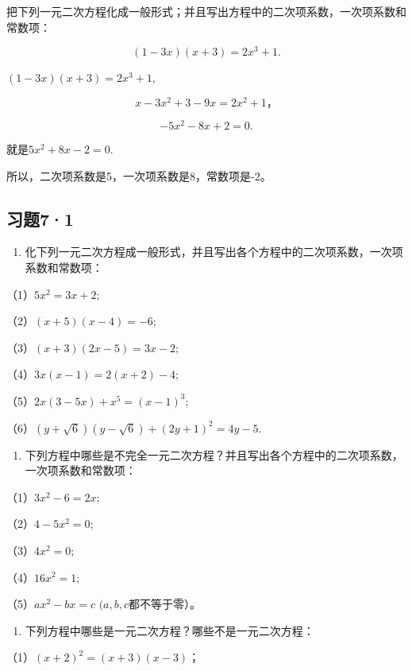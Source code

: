 把下列一元二次方程化成一般形式；并且写出方程中的二次项系数，一次项系数和常数项：

\[
(1 - 3 x) (x + 3) = 2 x ^ {3} + 1.
\]

 \((1 - 3x)(x + 3) = 2x^{3} + 1,\)

\[
x - 3 x ^ {2} + 3 - 9 x = 2 x ^ {2} + 1\text{，}
\]

\[
- 5 x ^ {2} - 8 x + 2 = 0.
\]

就是\(5x^{2} + 8x - 2 = 0.\)

所以，二次项系数是5，一次项系数是8，常数项是-2。

\subsection{习题7·1}

\begin{enumerate}
\item
  化下列一元二次方程成一般形式，并且写出各个方程中的二次项系数，一次项系数和常数项：
\end{enumerate}

（1）\(5x^{2} = 3x + 2;\)

（2）\((x + 5)(x - 4) = -6;\)

（3）\((x + 3)(2x - 5) = 3x - 2;\)

（4）\(3x(x - 1) = 2(x + 2) - 4;\)

（5）\(2x(3 - 5x) + x^5 = (x - 1)^3;\)

（6）\((y + \sqrt{6})(y - \sqrt{6}) + (2y + 1)^2 = 4y - 5.\)

\begin{enumerate}[start=2]
\item
  下列方程中哪些是不完全一元二次方程？并且写出各个方程中的二次项系数，一次项系数和常数项：
\end{enumerate}

（1）\(3x^{2} - 6 = 2x;\)

（2）\(4 - 5x^{2} = 0;\)

（3）\(4x^{2} = 0;\)

（4）\(16x^{2} = 1;\)

（5）\(ax^2 - bx = c\) \((a, b, c\)都不等于零）。

\begin{enumerate}[start=3]
\item
  下列方程中哪些是一元二次方程？哪些不是一元二次方程：
\end{enumerate}

（1）\((x + 2)^{2} = (x + 3)(x - 3)\)；

